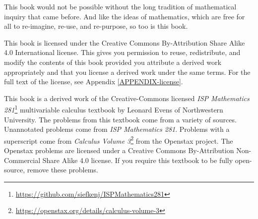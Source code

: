 This book would not be possible without the long tradition
of mathematical inquiry that came before.  And like the
ideas of mathematics, which are free for all to re-imagine,
re-use, and re-purpose, so too is this book.

This book is licensed under the Creative Commons By-Attribution
Share Alike 4.0 International license.  This gives you permission
to reuse, redistribute, and modify the contents of this book provided
you attribute a derived work appropriately and that you
license a derived work under the same terms.  For the full text
of the license, see Appendix \ref{APPENDIX-license}.

This book is a derived work of the Creative-Commons licensed
\emph{ISP Mathematics 281}\footnote{
\url{https://github.com/siefkenj/ISPMathematics281}
} multivariable calculus textbook by
Leonard Evens of Northwestern University.  The problems from this textbook
come from a variety of sources.  Unannotated problems come from \emph{ISP Mathematics 281}.
Problems with a superscript \openstax come from \emph{Calculus Volume 3}\footnote{
\url{https://openstax.org/details/calculus-volume-3}
} from the Openstax
project.  The Openstax problems are licensed under a Creative Commons By-Attribution
Non-Commercial Share Alike 4.0 license.  If you require this textbook to be fully open-source,
remove these problems.
